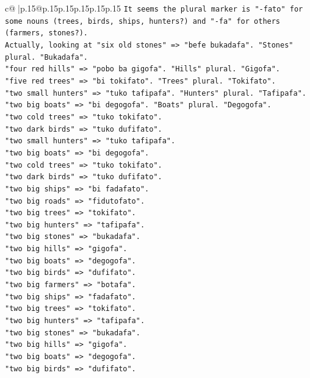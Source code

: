 \documentclass{article}
\begin{document}
{\begin{supertabular}{c@{$\;$}|p{.15\linewidth}@{}p{.15\linewidth}p{.15\linewidth}p{.15\linewidth}p{.15\linewidth}p{.15\linewidth}}
{{{\texttt{It seems the plural marker is "{-}fato" for some nouns (trees, birds, ships, hunters?) and "{-}fa" for others (farmers, stones?).} \\
\texttt{Actually, looking at "six old stones" => "befe bukadafa". "Stones" plural. "Bukadafa".} \\
\texttt{"four red hills" => "pobo ba gigofa". "Hills" plural. "Gigofa".} \\
\texttt{"five red trees" => "bi tokifato". "Trees" plural. "Tokifato".} \\
\texttt{"two small hunters" => "tuko tafipafa". "Hunters" plural. "Tafipafa".} \\
\texttt{"two big boats" => "bi degogofa". "Boats" plural. "Degogofa".} \\
\texttt{"two cold trees" => "tuko tokifato".} \\
\texttt{"two dark birds" => "tuko dufifato".} \\
\texttt{"two small hunters" => "tuko tafipafa".} \\
\texttt{"two big boats" => "bi degogofa".} \\
\texttt{"two cold trees" => "tuko tokifato".} \\
\texttt{"two dark birds" => "tuko dufifato".} \\
\texttt{"two big ships" => "bi fadafato".} \\
\texttt{"two big roads" => "fidutofato".} \\
\texttt{"two big trees" => "tokifato".} \\
\texttt{"two big hunters" => "tafipafa".} \\
\texttt{"two big stones" => "bukadafa".} \\
\texttt{"two big hills" => "gigofa".} \\
\texttt{"two big boats" => "degogofa".} \\
\texttt{"two big birds" => "dufifato".} \\
\texttt{"two big farmers" => "botafa".} \\
\texttt{"two big ships" => "fadafato".} \\
\texttt{"two big trees" => "tokifato".} \\
\texttt{"two big hunters" => "tafipafa".} \\
\texttt{"two big stones" => "bukadafa".} \\
\texttt{"two big hills" => "gigofa".} \\
\texttt{"two big boats" => "degogofa".} \\
\texttt{"two big birds" => "dufifato".} \\
}}}
\end{supertabular}}
\end{document}
